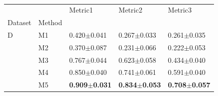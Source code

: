 \setlength{\parindent}{0pt}
\setlength{\intextsep}{0pt}  %
\begin{minipage}{\linewidth}
    \vspace{10pt}
\begin{table}[H]
    \centering
    \begin{tabular}{lllll}
    \toprule
       &           &                                       Metric1 &                                 Metric2 &                                      Metric3 \\
    Dataset & Method &                                          &                                          &                                          \\
    \midrule
    D & M1 &           0.420\footnotesize{$\pm$0.041} &           0.267\footnotesize{$\pm$0.033} &           0.261\footnotesize{$\pm$0.035} \\
       & M2 &           0.370\footnotesize{$\pm$0.087} &           0.231\footnotesize{$\pm$0.066} &           0.222\footnotesize{$\pm$0.053} \\
       & M3 &           0.767\footnotesize{$\pm$0.044} &           0.623\footnotesize{$\pm$0.058} &           0.434\footnotesize{$\pm$0.040} \\
       & M4 &           0.850\footnotesize{$\pm$0.040} &           0.741\footnotesize{$\pm$0.061} &           0.591\footnotesize{$\pm$0.040} \\
       & M5 &           \textbf{0.909\footnotesize{$\pm$0.031}} &           \textbf{0.834\footnotesize{$\pm$0.053}} &           \textbf{0.708\footnotesize{$\pm$0.057}} \\
    \bottomrule
    \end{tabular}
    \setlength{\abovecaptionskip}{0pt}
    \centering
    \vspace{3pt}
    \\
    \justifying
    \myriadpro\fontsize{8pt}{9.6pt}\selectfont

    \caption{}\label{table:dummy2}
\end{table}
\end{minipage}
\vspace{0pt}
\setlength{\intextsep}{12pt}
\setlength{\abovecaptionskip}{2pt}